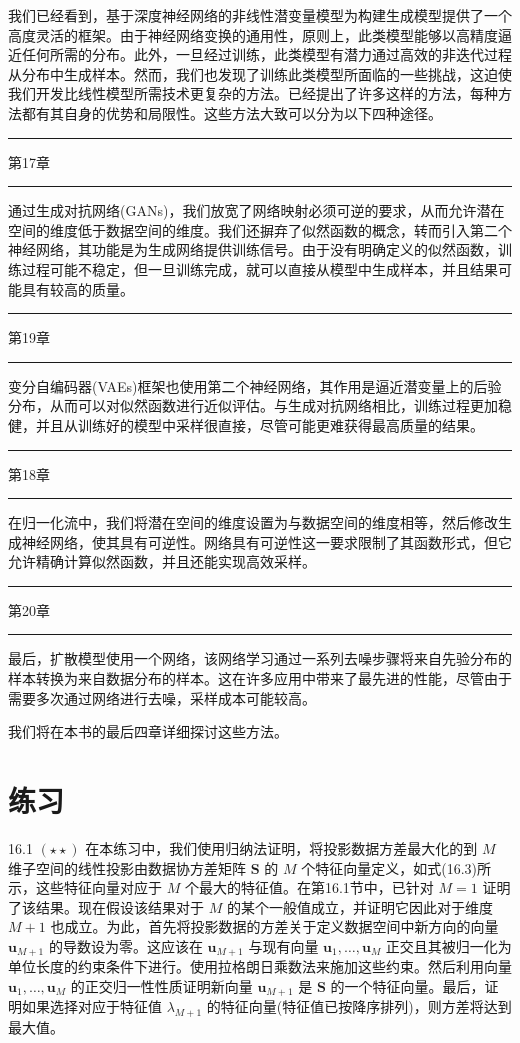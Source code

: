 \documentclass[10pt]{article}
\newcommand{\HRule}{\begin{center}\rule{0.9\linewidth}{0.2mm}\end{center}}
\begin{document}
我们已经看到，基于深度神经网络的非线性潜变量模型为构建生成模型提供了一个高度灵活的框架。由于神经网络变换的通用性，原则上，此类模型能够以高精度逼近任何所需的分布。此外，一旦经过训练，此类模型有潜力通过高效的非迭代过程从分布中生成样本。然而，我们也发现了训练此类模型所面临的一些挑战，这迫使我们开发比线性模型所需技术更复杂的方法。已经提出了许多这样的方法，每种方法都有其自身的优势和局限性。这些方法大致可以分为以下四种途径。

\HRule

第17章

\HRule

通过生成对抗网络(GANs)，我们放宽了网络映射必须可逆的要求，从而允许潜在空间的维度低于数据空间的维度。我们还摒弃了似然函数的概念，转而引入第二个神经网络，其功能是为生成网络提供训练信号。由于没有明确定义的似然函数，训练过程可能不稳定，但一旦训练完成，就可以直接从模型中生成样本，并且结果可能具有较高的质量。

\HRule

第19章

\HRule

变分自编码器(VAEs)框架也使用第二个神经网络，其作用是逼近潜变量上的后验分布，从而可以对似然函数进行近似评估。与生成对抗网络相比，训练过程更加稳健，并且从训练好的模型中采样很直接，尽管可能更难获得最高质量的结果。

\HRule

第18章

\HRule

在归一化流中，我们将潜在空间的维度设置为与数据空间的维度相等，然后修改生成神经网络，使其具有可逆性。网络具有可逆性这一要求限制了其函数形式，但它允许精确计算似然函数，并且还能实现高效采样。

\HRule

第20章

\HRule

最后，扩散模型使用一个网络，该网络学习通过一系列去噪步骤将来自先验分布的样本转换为来自数据分布的样本。这在许多应用中带来了最先进的性能，尽管由于需要多次通过网络进行去噪，采样成本可能较高。

我们将在本书的最后四章详细探讨这些方法。

\section*{练习}

16.1 \(\left( {\star  \star  }\right)\) 在本练习中，我们使用归纳法证明，将投影数据方差最大化的到 \(M\) 维子空间的线性投影由数据协方差矩阵 \(\mathbf{S}\) 的 \(M\) 个特征向量定义，如式(16.3)所示，这些特征向量对应于 \(M\) 个最大的特征值。在第16.1节中，已针对 \(M = 1\) 证明了该结果。现在假设该结果对于 \(M\) 的某个一般值成立，并证明它因此对于维度 \(M + 1\) 也成立。为此，首先将投影数据的方差关于定义数据空间中新方向的向量 \({\mathbf{u}}_{M + 1}\) 的导数设为零。这应该在 \({\mathbf{u}}_{M + 1}\) 与现有向量 \({\mathbf{u}}_{1},\ldots ,{\mathbf{u}}_{M}\) 正交且其被归一化为单位长度的约束条件下进行。使用拉格朗日乘数法来施加这些约束。然后利用向量 \({\mathbf{u}}_{1},\ldots ,{\mathbf{u}}_{M}\) 的正交归一性性质证明新向量 \({\mathbf{u}}_{M + 1}\) 是 \(\mathbf{S}\) 的一个特征向量。最后，证明如果选择对应于特征值 \({\lambda }_{M + 1}\) 的特征向量(特征值已按降序排列)，则方差将达到最大值。
\end{document}
